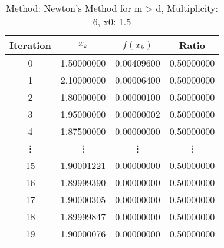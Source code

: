 \begin{table}
\centering
\caption{Method: Newton's Method for m > d, Multiplicity: 6, x0: 1.5}
\label{tab:table_Newton's_Method_for_m_>_d_6_1_5}
\begin{tabular}{c c c c}
\toprule
Iteration &      $x_k$ &   $f(x_k)$ &      Ratio \\
\midrule
        0 & 1.50000000 & 0.00409600 & 0.50000000 \\
        1 & 2.10000000 & 0.00006400 & 0.50000000 \\
        2 & 1.80000000 & 0.00000100 & 0.50000000 \\
        3 & 1.95000000 & 0.00000002 & 0.50000000 \\
        4 & 1.87500000 & 0.00000000 & 0.50000000 \\
   \vdots &     \vdots &     \vdots &     \vdots \\
       15 & 1.90001221 & 0.00000000 & 0.50000000 \\
       16 & 1.89999390 & 0.00000000 & 0.50000000 \\
       17 & 1.90000305 & 0.00000000 & 0.50000000 \\
       18 & 1.89999847 & 0.00000000 & 0.50000000 \\
       19 & 1.90000076 & 0.00000000 & 0.50000000 \\
\bottomrule
\end{tabular}
\end{table}
